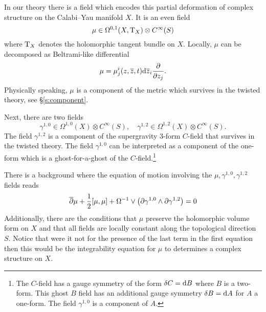 In our theory there is a field which encodes this partial deformation of complex structure on the Calabi--Yau manifold $X$.
It is an even field 
\[
\mu \in \Omega^{0,1} (X , {\rm T}_X) \otimes C^\infty(S) 
\]
where ${\rm T}_X$ denotes the holomorphic tangent bundle on $X$.
Locally, $\mu$ can be decomposed as Beltrami-like differential
\[
\mu = \mu^i_j (z,\overline{z}, t) {\rm d} \overline{z}_i \frac{\partial}{\partial z_j} .
\]
Physically speaking, $\mu$ is a component of the metric which survives in the twisted theory, see \S \ref{s:component}. 

Next, there are two fields 
\[
\gamma^{1,0} \in \Omega^{1,0} (X) \otimes C^\infty(S), \quad \gamma^{1,2} \in \Omega^{1,2}(X) \otimes C^\infty(S) .
\]
The field $\gamma^{1,2}$ is a component of the supergravity $3$-form $C$-field that survives in the twisted theory. 
The field $\gamma^{1,0}$ can be interpreted as a component of the one-form which is a ghost-for-a-ghost of the $C$-field.\footnote{The $C$-field has a gauge symmetry of the form $\delta C = {\rm d} B$ where $B$ is a two-form.
This ghost $B$ field has an additional gauge symmetry $\delta B = {\rm d} A$ for $A$ a one-form.
The field $\gamma^{1,0}$ is a component of $A$.}

There is a background where the equation of motion involving the $\mu, \gamma^{1,0}, \gamma^{1,2}$ fields reads
\begin{align*}
\overline{\partial} \mu + \frac12 [\mu, \mu] + \Omega^{-1} \vee \left(\partial \gamma^{1,0} \wedge \partial \gamma^{1,2} \right) & = 0 \\
\end{align*}
Additionally, there are the conditions that $\mu$ preserve the holomorphic volume form on $X$ and that all fields are locally constant along the topological direction $S$.  
Notice that were it not for the presence of the last term in the first equation then this would be the integrability equation for $\mu$ to determines a complex structure on $X$.

